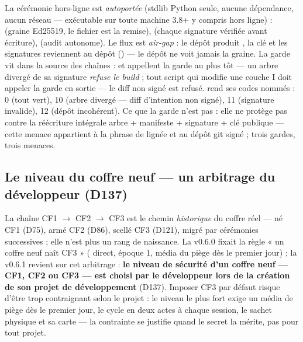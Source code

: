 La cérémonie hors-ligne est \emph{autoportée} (stdlib Python seule, aucune dépendance,
aucun réseau — exécutable sur toute machine 3.8+ y compris hors ligne) :
 (graine Ed25519, le fichier est la remise),  (chaque
signature vérifiée avant écriture),  (audit autonome). Le flux est
\emph{air-gap} : le dépôt produit , la clé et les signatures
reviennent au dépôt () — le dépôt ne voit jamais la graine. La
garde vit dans la source des chaînes :  et 
appellent la garde au plus tôt — un arbre divergé de sa signature \emph{refuse le build} ;
tout script qui modifie une couche I doit appeler la garde en sortie — le diff non signé
est refusé.  rend ses codes nommés : 0 (tout vert), 10 (arbre divergé —
diff d'intention non signé), 11 (signature invalide), 12 (dépôt incohérent). Ce que la
garde n'est pas : elle ne protège pas contre la réécriture intégrale arbre + manifeste +
signature + clé publique — cette menace appartient à la phrase de lignée et au dépôt git
signé ; trois gardes, trois menaces.

\subsection{Le niveau du coffre neuf — un arbitrage du développeur (D137)}\label{sec:initniveau}

La chaîne CF1 $\to$ CF2 $\to$ CF3 est le chemin \emph{historique} du coffre réel —
né CF1 (D75), armé CF2 (D86), scellé CF3 (D121), migré par cérémonies successives ;
elle n'est plus un rang de naissance. La v0.6.0 fixait la règle « un coffre neuf
naît CF3 » ( direct, époque 1, média du piège dès le premier jour) ; la
v0.6.1 revient sur cet arbitrage : \textbf{le niveau de sécurité d'un coffre neuf —
CF1, CF2 ou CF3 — est choisi par le développeur lors de la création de son projet de
développement} (D137). Imposer CF3 par défaut risque d'être trop contraignant selon
le projet : le niveau le plus fort exige un média de piège dès le premier jour, le
cycle en deux actes à chaque session, le sachet physique et sa carte — la contrainte
se justifie quand le secret la mérite, pas pour tout projet.

